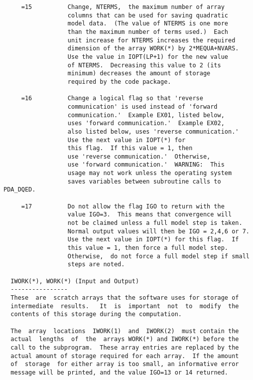 \begin{verbatim}
     =15          Change, NTERMS,  the maximum number of array
                  columns that can be used for saving quadratic
                  model data.  (The value of NTERMS is one more
                  than the maximum number of terms used.)  Each
                  unit increase for NTERMS increases the required
                  dimension of the array WORK(*) by 2*MEQUA+NVARS.
                  Use the value in IOPT(LP+1) for the new value
                  of NTERMS.  Decreasing this value to 2 (its
                  minimum) decreases the amount of storage
                  required by the code package.

     =16          Change a logical flag so that 'reverse
                  communication' is used instead of 'forward
                  communication.'  Example EX01, listed below,
                  uses 'forward communication.'  Example EX02,
                  also listed below, uses 'reverse communication.'
                  Use the next value in IOPT(*) for
                  this flag.  If this value = 1, then
                  use 'reverse communication.'  Otherwise,
                  use 'forward communication.'  WARNING:  This
                  usage may not work unless the operating system
                  saves variables between subroutine calls to PDA_DQED.

     =17          Do not allow the flag IGO to return with the
                  value IGO=3.  This means that convergence will
                  not be claimed unless a full model step is taken.
                  Normal output values will then be IGO = 2,4,6 or 7.
                  Use the next value in IOPT(*) for this flag.  If
                  this value = 1, then force a full model step.
                  Otherwise,  do not force a full model step if small
                  steps are noted.

  IWORK(*), WORK(*) (Input and Output)
  ----------------
  These  are  scratch arrays that the software uses for storage of
  intermediate  results.   It  is  important  not  to  modify  the
  contents of this storage during the computation.

  The  array  locations  IWORK(1)  and  IWORK(2)  must contain the
  actual  lengths  of  the  arrays WORK(*) and IWORK(*) before the
  call to the subprogram.  These array entries are replaced by the
  actual amount of storage required for each array.  If the amount
  of  storage  for either array is too small, an informative error
  message will be printed, and the value IGO=13 or 14 returned.


\end{verbatim}
